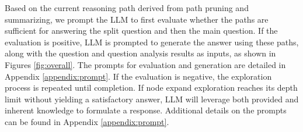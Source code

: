 
Based on the current reasoning path derived from path pruning and summarizing, we prompt the LLM to first evaluate whether the paths are sufficient for answering the split question and then the main question. If the evaluation is positive, LLM is prompted to generate the answer using these paths, along with the question and question analysis results as inputs, as shown in Figures \ref{fig:overall}. The prompts for evaluation and generation are detailed in Appendix \ref{appendix:prompt}. If the evaluation is negative, the exploration process is repeated until completion. If node expand exploration reaches its depth limit without yielding a satisfactory answer, LLM will leverage both provided and inherent knowledge to formulate a response. Additional details on the prompts can be found in Appendix \ref{appendix:prompt}.
